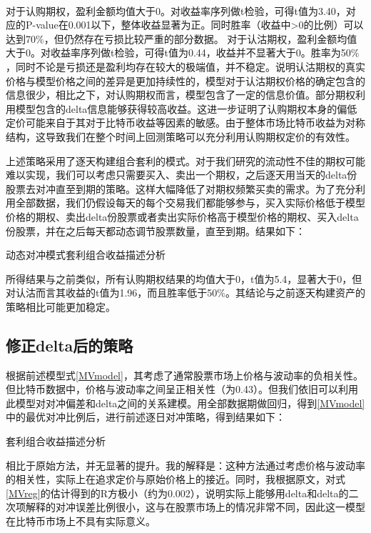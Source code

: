 ~\\
对于认购期权，盈利金额均值大于0。对收益率序列做t检验，可得t值为3.40，对应的P-value在0.001以下，整体收益显著为正。同时胜率（收益中>0的比例）可以达到70$\%$，但仍然存在亏损比较严重的部分数据。
对于认沽期权，盈利金额均值大于0。对收益率序列做t检验，可得t值为0.44，收益并不显著大于0。胜率为50$\%$，同时不论是亏损还是盈利均存在较大的极端值，并不稳定。说明认沽期权的真实价格与模型价格之间的差异是更加持续性的，模型对于认沽期权价格的确定包含的信息很少，相比之下，对认购期权而言，模型包含了一定的信息价值。部分期权利用模型包含的delta信息能够获得较高收益。这进一步证明了认购期权本身的偏低定价可能来自于其对于比特币收益等因素的敏感。由于整体市场比特币收益为对称结构，这导致我们在整个时间上回测策略可以充分利用认购期权定价的有效性。
\par{上述策略采用了逐天构建组合套利的模式。对于我们研究的流动性不佳的期权可能难以实现，我们可以考虑只需要买入、卖出一个期权，之后逐天用当天的delta份股票去对冲直至到期的策略。这样大幅降低了对期权频繁买卖的需求。为了充分利用全部数据，我们仍假设每天的每个交易我们都能够参与，买入实际价格低于模型价格的期权、卖出delta份股票或者卖出实际价格高于模型价格的期权、买入delta份股票，并在之后每天都动态调节股票数量，直至到期。结果如下：
}
\begin{table}[H]
    \caption{动态对冲模式套利组合收益描述分析}
    \centering
    

\end{table}
所得结果与之前类似，所有认购期权结果的均值大于0，t值为5.4，显著大于0，但对认沽而言其收益的t值为1.96，而且胜率低于50$\%$。其结论与之前逐天构建资产的策略相比可能更加稳定。
\subsection{修正delta后的策略}
根据前述模型式\ref{MVmodel}，其考虑了通常股票市场上价格与波动率的负相关性。但比特币数据中，价格与波动率之间呈正相关性（为0.43）。但我们依旧可以利用此模型对对冲偏差和delta之间的关系建模。用全部数据期做回归，得到\ref{MVmodel}中的最优对冲比例后，进行前述逐日对冲策略，得到结果如下：
\begin{table}[H]
    \caption{套利组合收益描述分析}
    \centering
    
    
\end{table}
相比于原始方法，并无显著的提升。我的解释是：这种方法通过考虑价格与波动率的相关性，实际上在追求定价与原始价格上的接近。同时，我根据原文，对式\ref{MVreg}的估计得到的R方极小（约为0.002），说明实际上能够用delta和delta的二次项解释的对冲误差比例很小，这与在股票市场上的情况非常不同，因此这一模型在比特币市场上不具有实际意义。
